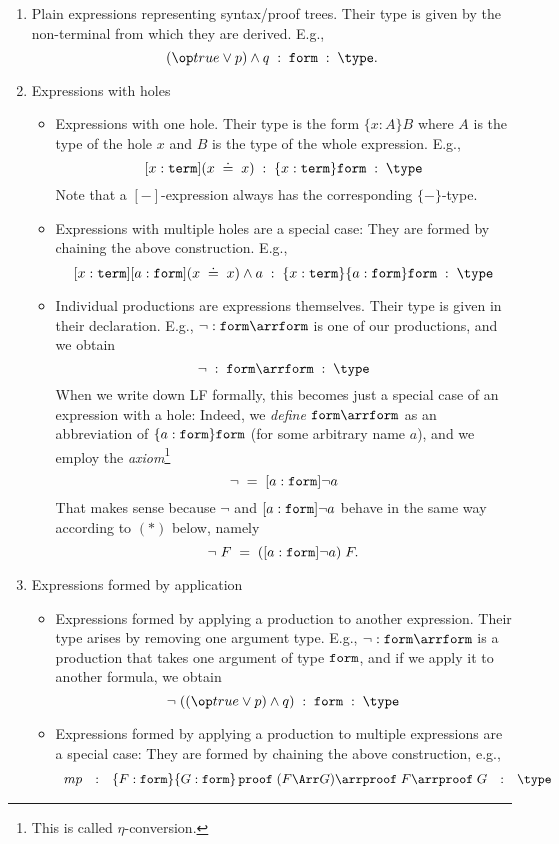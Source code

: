 \begin{enumerate}
 \item Plain expressions representing syntax/proof trees. Their type is given by the non-terminal from which they are derived. E.g.,
   \[(\true\vee p)\wedge q\;:\;\FORM\;:\;\type.\]
 \item Expressions with holes
   \begin{itemize}
     \item Expressions with one hole. Their type is the form $\{x:A\}B$ where $A$ is the type of the hole $x$ and $B$ is the type of the whole expression. E.g.,
   \[[x:\TERM](x\;\doteq\;x)\;:\;\{x:\TERM\}\FORM\;:\;\type\]
  Note that a $[-]$-expression always has the corresponding $\{-\}$-type.
     \item Expressions with multiple holes are a special case: They are formed by chaining the above construction. E.g.,
   \[[x:\TERM][a:\FORM](x\;\doteq\;x)\wedge a\;:\;\{x:\TERM\}\{a:\FORM\}\FORM\;:\;\type\]
     \item Individual productions are expressions themselves. Their type is given in their declaration.
        E.g., $\neg:\FORM\arr\FORM$ is one of our productions, and we obtain
        \[\neg\;:\;\FORM\arr\FORM\;:\;\type\]
        When we write down LF formally, this becomes just a special case of an expression with a hole: Indeed, we \emph{define} $\FORM\arr\FORM$ as an abbreviation of $\{a:\mathtt{form}\}\mathtt{form}$ (for some arbitrary name $a$), and we employ the \emph{axiom}\footnote{This is called $\eta$-conversion.}
        \[\neg \; = \; [a:\mathtt{form}]\neg a\]
        That makes sense because $\neg$ and $[a:\mathtt{form}]\neg a$ behave in the same way according to $(\ast)$ below, namely
        \[\neg\;F \;=\; ([a:\mathtt{form}]\neg a)\;F.\]
   \end{itemize}
 \item Expressions formed by application
    \begin{itemize}
      \item Expressions formed by applying a production to another expression. Their type arises by removing one argument type. E.g., $\neg:\FORM\arr\FORM$ is a production that takes one argument of type $\mathtt{form}$, and if we apply it to another formula, we obtain
   \[\neg\;((\true\vee p)\wedge q)\;:\;\FORM\;:\;\type\]
      \item Expressions formed by applying a production to multiple expressions are a special case: They are formed by chaining the above construction, e.g.,
   \[\begin{array}{lclcl}
      mp & : & \{F:\FORM\}\{G:\FORM\}\,\PROOF\;(F\impl G)\arr \PROOF\;F\arr\PROOF\;G & : & \type\\

\end{array}\]
\end{itemize}
\end{enumerate}
